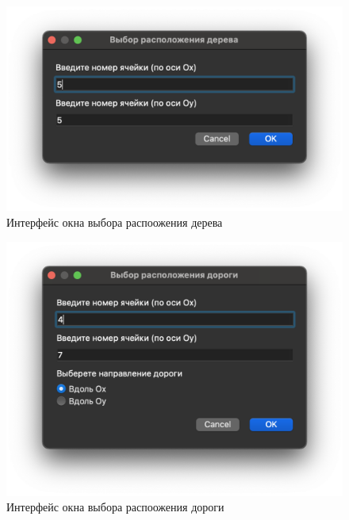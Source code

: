 \documentclass[a4paper,14pt, unknownkeysallowed]{extreport}
\begin{document}
\begin{figure}[h]
	\centering
	\includegraphics[scale=0.65]{img/tree.png}
	\caption{Интерфейс окна выбора распоожения дерева}
	\label{fig:tree}
\end{figure} 

\begin{figure}[h]
	\centering
	\includegraphics[scale=0.65]{img/road.png}
	\caption{Интерфейс окна выбора распоожения дороги}
	\label{fig:road}
\end{figure} 
\end{document}
